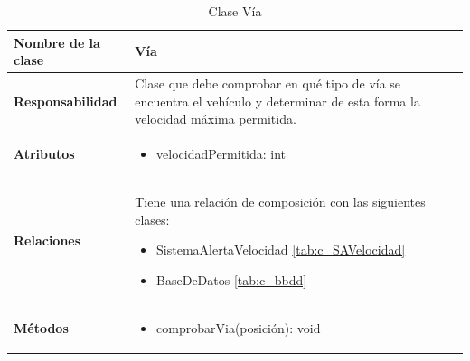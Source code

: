 







\begin{table}[h]
\begin{center}
\begin{tabular}{p{} p{11cm}}
\textbf{Nombre de la clase} &  Vía\\ \hline \hline
\textbf{Responsabilidad} &  Clase que debe comprobar en qué tipo de vía se encuentra el vehículo y determinar de esta forma la velocidad máxima permitida.  \\ \hline
\textbf{Atributos} & \begin{itemize}
                      \item velocidadPermitida: int
                    \end{itemize}\\ \hline
\textbf{Relaciones} & \par Tiene una relación de composición con las siguientes clases:
                      \begin{itemize}
                        \item SistemaAlertaVelocidad \ref{tab:c_SAVelocidad}
                        \item BaseDeDatos \ref{tab:c_bbdd}
                      \end{itemize}

                      \\ \hline

\textbf{Métodos} &  \begin{itemize}
                      \item comprobarVia(posición): void
                    \end{itemize}\\ \hline
\end{tabular}
\caption{Clase Vía}
\label{tab:c_via}
\end{center}
\end{table}








